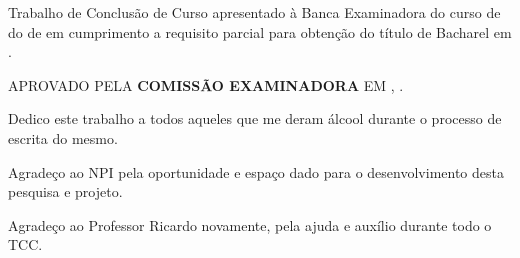 \documentclass[12pt,openright,oneside,a4paper,english,french,spanish,brazil]{unifil}
\begin{document}
\begin{folhadeaprovacao}
	\begin{center}
		\ABNTEXchapterfont\textbf{\MakeTextUppercase{\imprimirautor}}
		\vspace*{2cm}
		\begin{center}
			\ABNTEXchapterfont\large\textbf{\MakeTextUppercase{\imprimirtitulo}}
		\end{center}
		\vspace*{2cm}
		Trabalho de Conclusão de Curso apresentado à Banca Examinadora do curso de \imprimirpreambulo{} do \imprimirinstituicao{} de \imprimirlocal{} em cumprimento a requisito parcial para obtenção do título de Bacharel em \imprimirpreambulo.
		\par
		\vspace*{.5in}
		\hspace{.6\textwidth}
		\begin{minipage}{.6\textwidth}
			\begin{center}
\MakeTextUppercase{Aprovado pela \textbf{COMISSÃO EXAMINADORA} em \imprimirlocal, \imprimirdata.}
			\end{center}
		\end{minipage}
			\vspace*{\fill}
	\end{center}
\end{folhadeaprovacao}


\begin{epigrafe}
\vspace*{\fill}
\begin{flushright}
Dedico este trabalho a todos aqueles que me deram álcool durante o processo de escrita do mesmo.
\end{flushright}
\end{epigrafe} 


\begin{agradecimentos}

Agradeço ao NPI pela oportunidade e espaço dado para o desenvolvimento desta pesquisa e projeto.
\par Agradeço ao Professor Ricardo novamente, pela ajuda e auxílio durante todo o TCC.
\end{agradecimentos}
\end{document}
